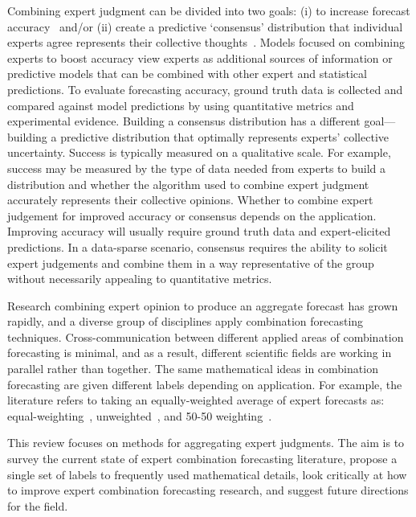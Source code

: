 \documentclass[preprint,authoryear]{elsarticle}
\begin{document}
Combining expert judgment can be divided into two goals: (i) to increase forecast accuracy~\cite{bates1969combination,granger1984improved} and/or (ii) create a predictive `consensus' distribution that individual experts agree represents their collective thoughts~\cite{stone1961opinion,genest1986combining,cooke1991experts}.
Models focused on combining experts to boost accuracy view experts as additional sources of information or predictive models that can be combined with other expert and statistical predictions.
To evaluate forecasting accuracy, ground truth data is collected and compared against model predictions by using quantitative metrics and experimental evidence.
Building a consensus distribution has a different goal---building a predictive distribution that optimally represents experts' collective uncertainty.
Success is typically measured on a qualitative scale.
For example, success may be measured by the type of data needed from experts to build a distribution and whether the algorithm used to combine expert judgment accurately represents their collective opinions.
Whether to combine expert judgement for improved accuracy or consensus depends on the application.
Improving accuracy will usually require ground truth data and expert-elicited predictions.
In a data-sparse scenario, consensus requires the ability to solicit expert judgements and combine them in a way representative of the group without necessarily appealing to quantitative metrics.

Research combining expert opinion to produce an aggregate forecast has grown rapidly, and a diverse group of disciplines apply combination forecasting techniques.
Cross-communication between different applied areas of combination forecasting is minimal, and as a result, different scientific fields are working in parallel rather than together.
The same mathematical ideas in combination forecasting are given different labels depending on application.
For example, the literature refers to taking an equally-weighted average of expert forecasts as: equal-weighting~\cite{cooke2014out,hanea2018value,ISI:000327676900001}, unweighted~\cite{graefe2015accuracy}, and 50-50 weighting~\cite{alvarado2017expertise}.

This review focuses on methods for aggregating expert judgments.
The aim is to survey the current state of expert combination forecasting literature, propose a single set of labels to frequently used mathematical details, look critically at how to improve expert combination forecasting research, and suggest future directions for the field. 
\end{document}
